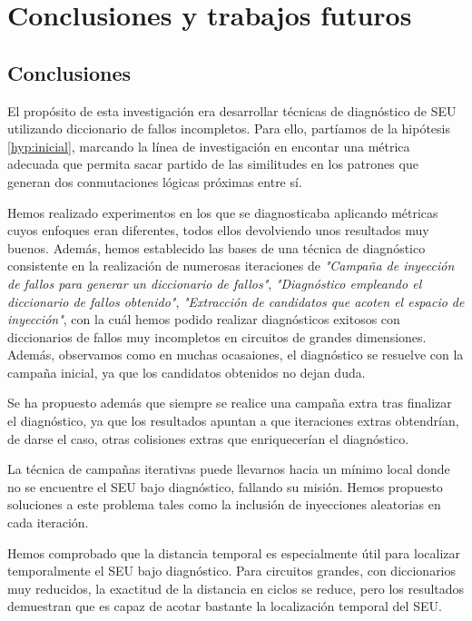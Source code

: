 \chapter{Conclusiones y trabajos futuros}
\label{ch:FFdist}

\section{Conclusiones}
\label{sec:Conclusiones}
El propósito de esta investigación era desarrollar técnicas de diagnóstico de
\gls{SEU} utilizando diccionario de fallos incompletos. Para ello, partíamos de la
hipótesis \ref{hyp:inicial}, marcando la línea de investigación en encontar una
métrica adecuada que permita sacar partido de las similitudes en los patrones que
generan dos conmutaciones lógicas próximas entre sí.

Hemos realizado experimentos en los que se diagnosticaba aplicando métricas cuyos
enfoques eran diferentes, todos ellos devolviendo unos resultados muy buenos.
Además, hemos establecido las bases de una técnica de diagnóstico consistente en
la realización de numerosas iteraciones de \textit{"Campaña de inyección de 
fallos para generar un diccionario de fallos"}, \textit{"Diagnóstico empleando el
diccionario de fallos obtenido"}, \textit{"Extracción de candidatos que acoten el
espacio de inyección"}, con la cuál hemos podido realizar diagnósticos exitosos 
con diccionarios de fallos muy incompletos en circuitos de grandes dimensiones.
Además, observamos como en muchas ocasaiones, el diagnóstico se resuelve con la
campaña inicial, ya que los candidatos obtenidos no dejan duda.

Se ha propuesto además que siempre se realice una campaña extra tras finalizar el
diagnóstico, ya que los resultados apuntan a que iteraciones extras obtendrían, de
darse el caso, otras colisiones extras que enriquecerían el diagnóstico.

La técnica de campañas iterativas puede llevarnos hacia un mínimo local donde no
se encuentre el \gls{SEU} bajo diagnóstico, fallando su misión. Hemos propuesto
soluciones a este problema tales como la inclusión de inyecciones aleatorias en
cada iteración.

Hemos comprobado que la distancia temporal es especialmente útil para localizar
temporalmente el \gls{SEU} bajo diagnóstico. Para circuitos grandes, con
diccionarios muy reducidos, la exactitud de la distancia en ciclos se reduce, pero
los resultados demuestran que es capaz de acotar bastante la localización temporal
del \gls{SEU}.

